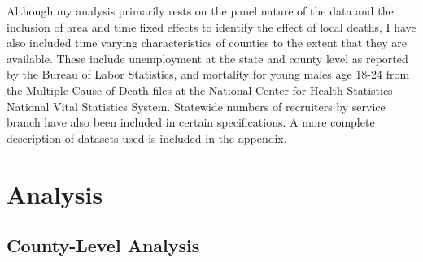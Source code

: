 \documentclass[12pt] {article}
\begin{document}
Although my analysis primarily rests on the panel nature of the data
and the inclusion of area and time fixed effects to identify the effect
of local deaths, I have also included time varying characteristics
of counties to the extent that they are available. These include unemployment
at the state and county level as reported by the Bureau of Labor Statistics, and mortality for young males age 18-24 from the Multiple Cause of Death files at the National Center for Health Statistics National Vital Statistics System. Statewide numbers of recruiters by service branch have also been included in certain specifications. 
A more complete description of datasets used is included in the appendix.

\section{Analysis\label{sec:Analysis}}


\subsection{County-Level Analysis\label{sub:County OLS}}
\end{document}
